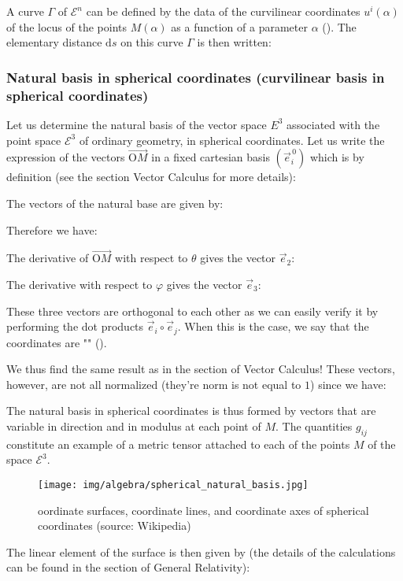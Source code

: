 	A curve $\Gamma$  of $\mathcal{E}^n$ can be defined by the data of the curvilinear coordinates $u^i(\alpha)$ of the locus of the points $M(\alpha)$ as a function of a parameter $\alpha$ (). The elementary distance $\mathrm{d}s$ on this curve $\Gamma$ is then written:
	
	
	\subsubsection{Natural basis in spherical coordinates (curvilinear basis in spherical coordinates)}
	Let us determine the natural basis of the vector space $E^3$ associated with the point space $\mathcal{E}^3$ of ordinary geometry, in spherical coordinates. Let us write the expression of the vectors $\overrightarrow{\text{O}M}$ in a fixed cartesian basis $(\vec{e}_i^{\,0})$ which is by definition (see the section Vector Calculus for more details):
	
	The vectors of the natural base are given by:
	
	Therefore we have:
	
	The derivative of $\overrightarrow{\text{O}M}$ with respect to $\theta$ gives the vector $\vec{e}_2$:
	
	The derivative with respect to $\varphi$ gives the vector $\vec{e}_3$:
	
	These three vectors are orthogonal to each other as we can easily verify it by performing the dot products $\vec{e}_i\circ\vec{e}_j$. When this is the case, we say that the coordinates are "" ().

	We thus find the same result as in the section of Vector Calculus! These vectors, however, are not all normalized (they're norm is not equal to $1$) since we have:
	
	The natural basis in spherical coordinates is thus formed by vectors that are variable in direction and in modulus at each point of $M$. The quantities $g_{ij}$ constitute an example of a metric tensor attached to each of the points $M$ of the space $\mathcal{E}^3$.
	\begin{figure}[H]
		\centering
		\texttt{[image: img/algebra/spherical\_natural\_basis.jpg]}
		\caption{oordinate surfaces, coordinate lines, and coordinate axes of spherical coordinates (source: Wikipedia)}
	\end{figure}
	The linear element of the surface is then given by (the details of the calculations can be found in the section of General Relativity):
	
